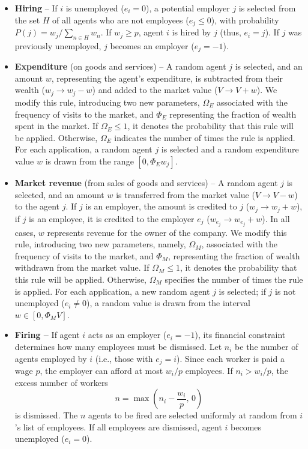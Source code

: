 \begin{itemize}

\item  {\bf Hiring} -- If $i$ is unemployed ($e_i=0$), a potential employer $j$ is selected from the set $H$  of all agents who are not employees ($e_j \leq 0$), with  probability  $P (j)= w_{j}/\sum_{n\in H}w_{n}$.   If $ w_j \ge p$, agent $i$ is hired by $j$ (thus, $e_i=j$).    If $j$ was previously unemployed, $j$ becomes an employer ($e_j=-1$).

\item   {\bf  Expenditure} (on goods and services) -- A random agent $j$ is selected, and an amount $w$, representing the agent's expenditure, is subtracted from their wealth ($w_j \to w_j-w$) and added to the market value ($V \to V+w$).
We modify this rule, introducing two new parameters,  $\Omega_E$ associated with the frequency of visits to the market, and $\Phi_E$ representing the fraction of wealth spent in the market.
%
If $\Omega_E\leq1$, it denotes the probability that this rule will be applied.  
Otherwise, $\Omega_E$ indicates the number of times the rule is applied. 
For each application, a random agent $j$ is selected and a random expenditure value $w$ is drawn from the range $\left[0,\Phi_E w_j\right]$. 
 
\item {\bf Market revenue} (from sales of goods and services) -- 
A random agent $j$ is selected, and an amount $w$ is  transferred from the market value ($V \to V - w$) to the agent $j$.  If $j$ is an employer, the amount is credited to $j$ ($w_j \to w_j + w$), if $j$ is an employee, it is credited to the employer $e_j$  ($w_{e_j} \to w_{e_j} + w$).  In all cases,  $w$ represents revenue for the owner of the company.
We modify this rule, introducing two new parameters, namely,  $\Omega_M$, associated with the frequency of visits to the market, and $\Phi_M$, representing the fraction of wealth withdrawn from the market value.
%
If $\Omega_M\leq1$, it denotes the probability that this rule will be applied.
Otherwise, $\Omega_M$ specifies the number of times the rule is applied.  For each application, a new random agent $j$ is selected; if $j$  is not unemployed ($e_i\neq 0$), a random value is drawn from the interval $w \in [0, \Phi_M V]$.

\item {\bf Firing --} If agent $i$ acts as an employer ($e_i=-1$), its financial constraint determines how many employees must be dismissed. Let $n_i$ be the number of agents employed by $i$ (i.e., those with $e_j=i$). Since each worker is paid a wage $p$, the employer can afford at most $w_i/p$ employees. If $n_i > w_i/p$, the excess number of workers
\begin{equation*}
n = \max\!\left(n_i - \frac{w_i}{p},\,0\right)
\end{equation*}
is dismissed. The $n$ agents to be fired are selected uniformly at random from $i$’s list of employees. If all employees are dismissed, agent $i$ becomes unemployed ($e_i=0$).


\end{itemize}
